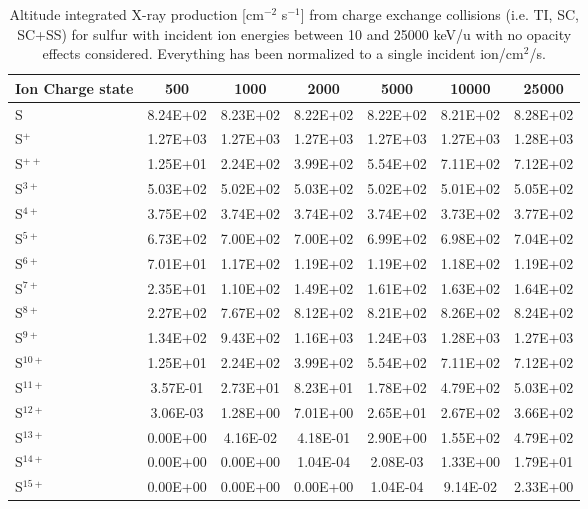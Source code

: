 \begin{table}[h]
\begin{tabular}{l|c|c|c|c|c|c}
    Ion Charge state & 500 & 1000 & 2000 & 5000 & 10000 & 25000 \\
    \hline
    S & 8.24E+02 & 8.23E+02 & 8.22E+02 & 8.22E+02 & 8.21E+02 & 8.28E+02 \\
    S$^+$ & 1.27E+03 & 1.27E+03 & 1.27E+03 & 1.27E+03 & 1.27E+03 & 1.28E+03 \\
    S$^{++}$ & 1.25E+01 & 2.24E+02 & 3.99E+02 & 5.54E+02 & 7.11E+02 & 7.12E+02 \\
    S$^{3+}$ & 5.03E+02 & 5.02E+02 & 5.03E+02 & 5.02E+02 & 5.01E+02 & 5.05E+02 \\
    S$^{4+}$ & 3.75E+02 & 3.74E+02 & 3.74E+02 & 3.74E+02 & 3.73E+02 & 3.77E+02 \\
    S$^{5+}$ & 6.73E+02 & 7.00E+02 & 7.00E+02 & 6.99E+02 & 6.98E+02 & 7.04E+02 \\
    S$^{6+}$ & 7.01E+01 & 1.17E+02 & 1.19E+02 & 1.19E+02 & 1.18E+02 & 1.19E+02 \\
    S$^{7+}$ & 2.35E+01 & 1.10E+02 & 1.49E+02 & 1.61E+02 & 1.63E+02 & 1.64E+02 \\
    S$^{8+}$ & 2.27E+02 & 7.67E+02 & 8.12E+02 & 8.21E+02 & 8.26E+02 & 8.24E+02 \\
    S$^{9+}$ & 1.34E+02 & 9.43E+02 & 1.16E+03 & 1.24E+03 & 1.28E+03 & 1.27E+03 \\
    S$^{10+}$ & 1.25E+01 & 2.24E+02 & 3.99E+02 & 5.54E+02 & 7.11E+02 & 7.12E+02 \\
    S$^{11+}$ & 3.57E-01 & 2.73E+01 & 8.23E+01 & 1.78E+02 & 4.79E+02 & 5.03E+02 \\
    S$^{12+}$ & 3.06E-03 & 1.28E+00 & 7.01E+00 & 2.65E+01 & 2.67E+02 & 3.66E+02 \\
    S$^{13+}$ & 0.00E+00 & 4.16E-02 & 4.18E-01 & 2.90E+00 & 1.55E+02 & 4.79E+02 \\
    S$^{14+}$ & 0.00E+00 & 0.00E+00 & 1.04E-04 & 2.08E-03 & 1.33E+00 & 1.79E+01 \\
    S$^{15+}$ & 0.00E+00 & 0.00E+00 & 0.00E+00 & 1.04E-04 & 9.14E-02 & 2.33E+00 \\
    \hline
    \end{tabular}
    \caption{Altitude integrated X-ray production [cm$^{-2}$ s$^{-1}$] from charge exchange collisions (i.e. TI, SC, SC+SS) for sulfur with incident ion energies between 10 and 25000 keV/u with no opacity effects considered. Everything has been normalized to a single incident ion/cm$^2$/s.}
    \label{tab:SulCXProd}
\end{table}

